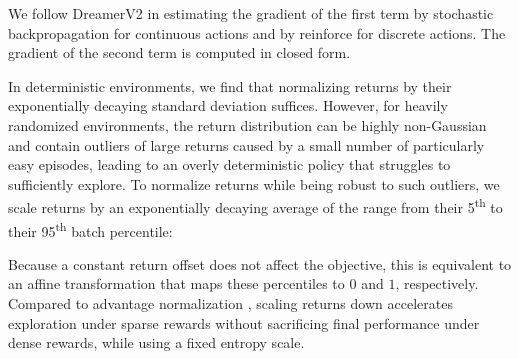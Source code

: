 
We follow DreamerV2 \citep{hafner2020dreamerv2} in estimating the gradient of the first term by stochastic backpropagation for continuous actions and by reinforce \citep{williams1992reinforce} for discrete actions. The gradient of the second term is computed in closed form.

In deterministic environments, we find that normalizing returns by their exponentially decaying standard deviation suffices.
However, for heavily randomized environments, the return distribution can be highly non-Gaussian and contain outliers of large returns caused by a small number of particularly easy episodes, leading to an overly deterministic policy that struggles to sufficiently explore.
To normalize returns while being robust to such outliers, we scale returns by an exponentially decaying average of the range from their
5\textsuperscript{th} to their 95\textsuperscript{th} batch percentile:


Because a constant return offset does not affect the objective, this is equivalent to an affine transformation that maps these percentiles to $0$ and $1$, respectively.
Compared to advantage normalization \citep{schulman2017ppo}, scaling returns down accelerates exploration under sparse rewards without sacrificing final performance under dense rewards, while using a fixed entropy scale.
